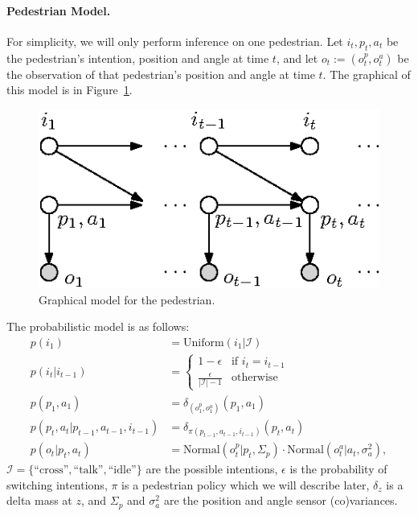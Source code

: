 \documentclass[a4paper]{article}
\newcommand{\given}{\lvert}
\begin{document}
\paragraph{Pedestrian Model.}
For simplicity, we will only perform inference on one pedestrian.
Let $i_t, p_t, a_t$ be the pedestrian's intention, position and angle at time $t$, and let $o_t := (o_t^p, o_t^a)$ be the observation of that pedestrian's position and angle at time $t$. The graphical of this model is in Figure~\ref{fig:talking_pedestrians_4}.
\begin{figure}[htb]
    \centering
    \includegraphics{figures/talking_pedestrians_4}
    \caption{Graphical model for the pedestrian.}
    \label{fig:talking_pedestrians_4}
\end{figure}

The probabilistic model is as follows:
\begin{align}
    p(i_1) &= \mathrm{Uniform}(i_1 \given \mathcal I) \\
    p(i_t \given i_{t - 1}) &=
        \begin{cases}
            1 - \epsilon & \text{if } i_t = i_{t - 1} \\
            \frac{\epsilon}{|\mathcal I| - 1} & \text{otherwise}
        \end{cases} \\
    p(p_1, a_1) &= \delta_{(o_1^p, o_1^a)}(p_1, a_1) \\
    p(p_t, a_t \given p_{t - 1}, a_{t - 1}, i_{t - 1}) &= \delta_{\pi(p_{t - 1}, a_{t - 1}, i_{t - 1})}(p_t, a_t) \\
    p(o_t \given p_t, a_t) &= \mathrm{Normal}(o_t^p \given p_t, \Sigma_p) \cdot \mathrm{Normal}(o_t^a \given a_t, \sigma_a^2), \label{eq:sensor}
\end{align}
$\mathcal I = \{\text{``cross''}, \text{``talk''}, \text{``idle''}\}$ are the possible intentions,
$\epsilon$ is the probability of switching intentions,
$\pi$ is a pedestrian policy which we will describe later,
$\delta_z$ is a delta mass at $z$,
and $\Sigma_p$ and $\sigma_a^2$ are the position and angle sensor (co)variances.
\end{document}
